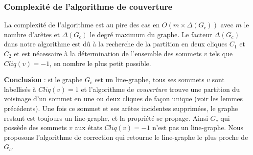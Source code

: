 \subsubsection{Complexit\'e de l'algorithme de couverture}
La complexit\'e de l'algorithme est au pire des cas en $O(m \times \Delta(G_c))$ avec $m$ le nombre d'ar\^etes et $\Delta(G_c)$ le degr\'e maximum du graphe.
Le facteur $\Delta(G_c)$ dans notre algorithme est d\^u \`a la recherche de la partition en deux cliques $C_1$ et $C_2$ et est n\'ecessaire \`a la d\'etermination de l'ensemble des sommets $v$ tels que $Cliq(v) = -1$, en nombre le plus petit possible.
\newline

{\bf Conclusion} : si le graphe $G_c$ est un line-graphe, tous ses sommets $v$ sont labellis\'es \`a $Cliq(v) = 1$ et l'algorithme  de {\em couverture} trouve une partition du voisinage d'un sommet en une ou deux cliques de fa\c con unique (voir les lemmes pr\'ec\'edents). 
Une fois ce sommet et ses ar\^etes incidentes supprim\'ees, le graphe restant est toujours un line-graphe, et la propri\'et\'e se propage.
Ainsi $G_c$ qui poss\`ede des sommets $v$ aux \'etats $Cliq(v) = -1$ n'est pas un line-graphe. Nous proposons l'algorithme de correction qui retourne le line-graphe le plus proche de $G_c$.


